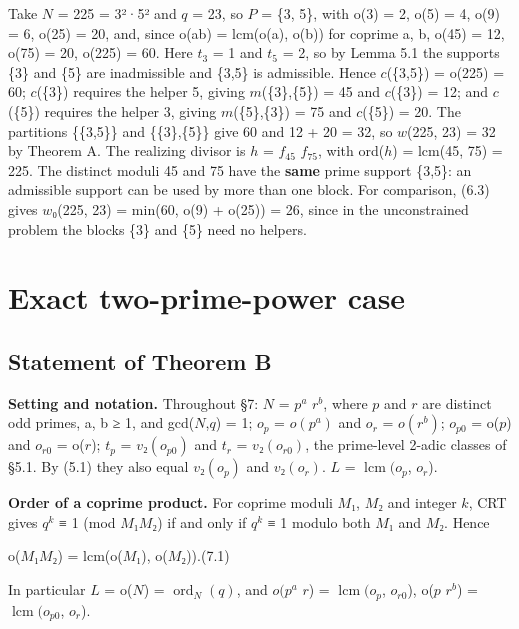 \documentclass[pdflatex,sn-mathphys-num]{sn-jnl}
\theoremstyle{thmstyleone}
\theoremstyle{thmstylethree}
\begin{document}
Take \(N\) = 225 = 3²·5² and \(q\) = 23, so \(P\) = \{3, 5\}, with o(3) = 2, o(5) = 4, o(9) = 6, o(25) = 20, and, since o(ab) = lcm(o(a), o(b)) for coprime a, b, o(45) = 12, o(75) = 20, o(225) = 60. Here \(t_3\) = 1 and \(t_5\) = 2, so by Lemma 5.1 the supports \{3\} and \{5\} are inadmissible and \{3,5\} is admissible. Hence \(c\)(\{3,5\}) = o(225) = 60; \(c\)(\{3\}) requires the helper 5, giving \(m\)(\{3\},\{5\}) = 45 and \(c\)(\{3\}) = 12; and \(c\)(\{5\}) requires the helper 3, giving \(m\)(\{5\},\{3\}) = 75 and \(c\)(\{5\}) = 20. The partitions \{\{3,5\}\} and \{\{3\},\{5\}\} give 60 and 12 + 20 = 32, so \(w\)(225, 23) = 32 by Theorem A. The realizing divisor is \(h\) = \(f_{45}\) \(f_{75}\), with ord(\(h\)) = lcm(45, 75) = 225. The distinct moduli 45 and 75 have the \textbf{same} prime support \{3,5\}: an admissible support can be used by more than one block. For comparison, (6.3) gives \(w\)₀(225, 23) = min(60, o(9) + o(25)) = 26, since in the unconstrained problem the blocks \{3\} and \{5\} need no helpers.

\section{Exact two-prime-power case}

\subsection{Statement of Theorem B}

\textbf{Setting and notation.} Throughout §7: \(N\) = \(p^a\) \(r^b\), where \(p\) and \(r\) are distinct odd primes, a, b ≥ 1, and gcd(\(N\),\(q\)) = 1; \(o_p\) = \(o(p^a)\) and \(o_r\) = \(o(r^b)\); \(o_{p0}\) = o(\(p\)) and \(o_{r0}\) = o(\(r\)); \(t_p\) = \(v₂(o_{p0})\) and \(t_r\) = \(v₂(o_{r0})\), the prime-level 2-adic classes of §5.1. By (5.1) they also equal \(v₂(o_p)\) and \(v₂(o_r)\). \(L\) = \(\operatorname{lcm}(o_p\), \(o_r\)).

\textbf{Order of a coprime product.} For coprime moduli \(M\)₁, \(M\)₂ and integer \(k\), CRT gives \(q^k\) ≡ 1 (mod \(M\)₁\(M\)₂) if and only if \(q^k\) ≡ 1 modulo both \(M\)₁ and \(M\)₂. Hence

\begin{center}o(\(M\)₁\(M\)₂) = lcm(o(\(M\)₁), o(\(M\)₂)).\qquad (7.1)\end{center}

In particular \(L\) = o(\(N\)) = \(\operatorname{ord}_N(q)\), and \(o(p^a\) \(r\)) = \(\operatorname{lcm}(o_p\), \(o_{r0}\)), o(\(p\) \(r^b\)) = \(\operatorname{lcm}(o_{p0}\), \(o_r\)).
\end{document}
